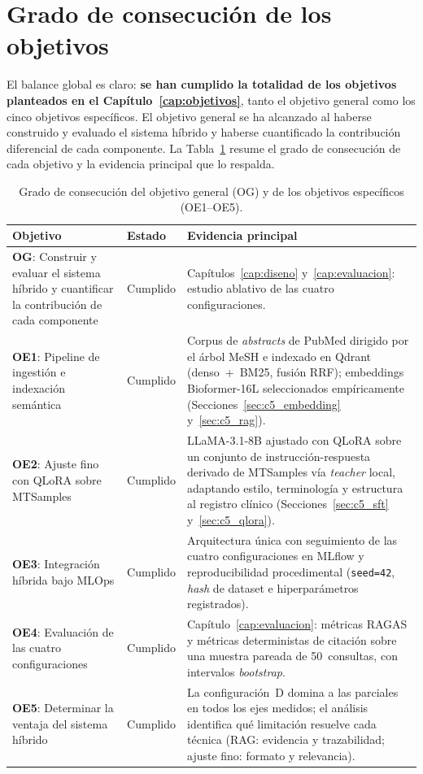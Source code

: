 \documentclass[11pt,a4paper,spanish]{book}
\numberwithin{equation}{chapter}
\numberwithin{figure}{chapter}
\begin{document}
\section{Grado de consecución de los objetivos}
\label{sec:c7_objetivos}

El balance global es claro: \textbf{se han cumplido la totalidad de los objetivos planteados en el Capítulo~\ref{cap:objetivos}}, tanto el objetivo general como los cinco objetivos específicos. El objetivo general se ha alcanzado al haberse construido y evaluado el sistema híbrido y haberse cuantificado la contribución diferencial de cada componente. La Tabla~\ref{tab:c7_objetivos} resume el grado de consecución de cada objetivo y la evidencia principal que lo respalda.

\begin{table}[h]
\centering
\small
\renewcommand{\arraystretch}{1.25}
\begin{tabular}{|p{}|p{}|p{}|}
\hline
\textbf{Objetivo} & \textbf{Estado} & \textbf{Evidencia principal} \\
\hline
\textbf{OG}: Construir y evaluar el sistema híbrido y cuantificar la contribución de cada componente & Cumplido & Capítulos~\ref{cap:diseno} y~\ref{cap:evaluacion}: estudio ablativo de las cuatro configuraciones. \\
\hline
\textbf{OE1}: Pipeline de ingestión e indexación semántica & Cumplido & Corpus de \textit{abstracts} de PubMed dirigido por el árbol MeSH e indexado en Qdrant (denso~+~BM25, fusión RRF); embeddings Bioformer-16L seleccionados empíricamente (Secciones~\ref{sec:c5_embedding} y~\ref{sec:c5_rag}). \\
\hline
\textbf{OE2}: Ajuste fino con QLoRA sobre MTSamples & Cumplido & LLaMA-3.1-8B ajustado con QLoRA sobre un conjunto de instrucción-respuesta derivado de MTSamples vía \textit{teacher} local, adaptando estilo, terminología y estructura al registro clínico (Secciones~\ref{sec:c5_sft} y~\ref{sec:c5_qlora}). \\
\hline
\textbf{OE3}: Integración híbrida bajo MLOps & Cumplido & Arquitectura única con seguimiento de las cuatro configuraciones en MLflow y reproducibilidad procedimental (\texttt{seed=42}, \textit{hash} de dataset e hiperparámetros registrados). \\
\hline
\textbf{OE4}: Evaluación de las cuatro configuraciones & Cumplido & Capítulo~\ref{cap:evaluacion}: métricas RAGAS y métricas deterministas de citación sobre una muestra pareada de 50~consultas, con intervalos \textit{bootstrap}. \\
\hline
\textbf{OE5}: Determinar la ventaja del sistema híbrido & Cumplido & La configuración~D domina a las parciales en todos los ejes medidos; el análisis identifica qué limitación resuelve cada técnica (RAG: evidencia y trazabilidad; ajuste fino: formato y relevancia). \\
\hline
\end{tabular}
\caption{Grado de consecución del objetivo general (OG) y de los objetivos específicos (OE1--OE5).}
\label{tab:c7_objetivos}
\end{table}
\end{document}
